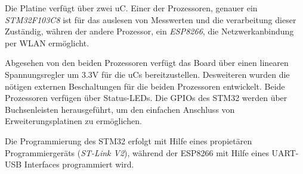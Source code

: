 \smallskip


Die Platine verfügt über zwei \ac{uC}. Einer der Prozessoren, genauer ein \textit{STM32F103C8} ist für das auslesen von Messwerten und die
verarbeitung dieser Zuständig, währen der andere Prozessor, ein \textit{ESP8266}, die Netzwerkanbindung per \acs{WLAN} ermöglicht.

\smallskip

Abgesehen von den beiden Prozessoren verfügt das Board über einen linearen Spannungsregler um 3.3V für die \acp{uC} bereitzustellen. Desweiteren
wurden die nötigen externen Beschaltungen für die beiden Prozessoren entwickelt. Beide Prozessoren verfügen über Status-LEDs. 
Die \acp{GPIO} des STM32 werden über Buchsenleisten herausgeführt, um den einfachen Anschluss von Erweiterungsplatinen zu ermöglichen.

\smallskip

Die Programmierung des STM32 erfolgt mit Hilfe eines propietären Programmiergeräts (\textit{ST-Link V2}), während der ESP8266 mit Hilfe eines
\acs{UART}-\acs{USB} Interfaces programmiert wird. 
